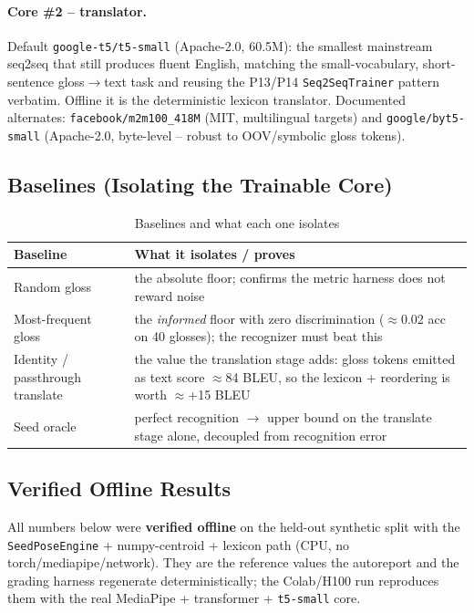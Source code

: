\documentclass[12pt,a4paper]{article}
\begin{document}
\paragraph{Core \#2 -- translator.} Default \texttt{google-t5/t5-small} (Apache-2.0, 60.5M): the smallest mainstream seq2seq that still produces fluent English, matching the small-vocabulary, short-sentence gloss$\rightarrow$text task and reusing the P13/P14 \texttt{Seq2SeqTrainer} pattern verbatim. Offline it is the deterministic lexicon translator. Documented alternates: \texttt{facebook/m2m100\_418M} (MIT, multilingual targets) and \texttt{google/byt5-small} (Apache-2.0, byte-level -- robust to OOV/symbolic gloss tokens).

\subsection{Baselines (Isolating the Trainable Core)}

\begin{table}[H]
\centering
\caption{Baselines and what each one isolates}
\small
\begin{tabularx}{\linewidth}{@{} l L @{}}
\toprule
\textbf{Baseline} & \textbf{What it isolates / proves} \\
\midrule
Random gloss & the absolute floor; confirms the metric harness does not reward noise \\
Most-frequent gloss & the \emph{informed} floor with zero discrimination ($\approx$0.02 acc on 40 glosses); the recognizer must beat this \\
Identity / passthrough translate & the value the translation stage adds: gloss tokens emitted as text score $\approx$84 BLEU, so the lexicon + reordering is worth $\approx$+15 BLEU \\
Seed oracle & perfect recognition $\rightarrow$ upper bound on the translate stage alone, decoupled from recognition error \\
\bottomrule
\end{tabularx}
\end{table}

\subsection{Verified Offline Results}

All numbers below were \textbf{verified offline} on the held-out synthetic split with the \texttt{SeedPoseEngine} + numpy-centroid + lexicon path (CPU, no torch/mediapipe/network). They are the reference values the autoreport and the grading harness regenerate deterministically; the Colab/H100 run reproduces them with the real MediaPipe + transformer + \texttt{t5-small} core.
\end{document}
